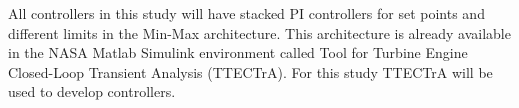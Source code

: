 
All controllers in this study will have stacked PI controllers for set points and different limits in the Min-Max architecture\cite{Csank:2010}. This architecture is already available in the NASA Matlab Simulink environment called Tool for Turbine Engine Closed-Loop Transient Analysis \cite{Csank:2014} (TTECTrA). For this study TTECTrA will be used to develop controllers.     